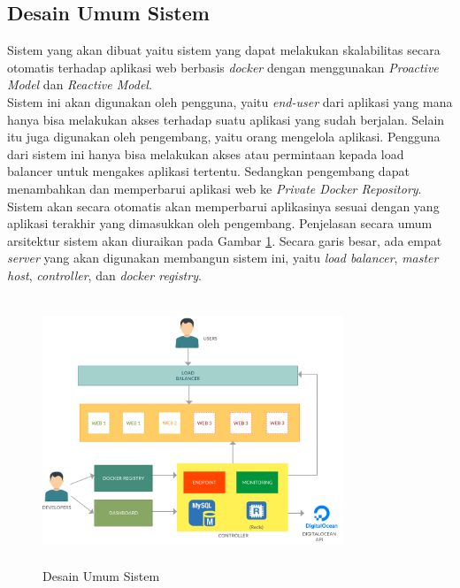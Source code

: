 		\subsection{Desain Umum Sistem}
			Sistem yang akan dibuat yaitu sistem yang dapat melakukan skalabilitas secara otomatis terhadap aplikasi web berbasis \textit{docker} dengan menggunakan \textit{Proactive Model} dan \textit{Reactive Model}.\\
			\indent Sistem ini akan digunakan oleh pengguna, yaitu \textit{end-user} dari aplikasi yang mana hanya bisa melakukan akses terhadap suatu aplikasi yang sudah berjalan. Selain itu juga digunakan oleh pengembang, yaitu orang mengelola aplikasi. Pengguna dari sistem ini hanya bisa melakukan akses atau permintaan kepada load balancer untuk mengakes aplikasi tertentu. Sedangkan pengembang dapat menambahkan dan memperbarui aplikasi web ke \textit{Private Docker Repository}. Sistem akan secara otomatis akan memperbarui aplikasinya sesuai dengan yang aplikasi terakhir yang dimasukkan oleh pengembang. Penjelasan secara umum arsitektur sistem akan diuraikan pada Gambar \ref{DesainUmumSistem}. Secara garis besar, ada empat \textit{server} yang akan digunakan membangun sistem ini, yaitu \textit{load balancer}, \textit{master host}, \textit{controller}, dan \textit{docker registry}.
            \begin{figure}[H]
				\centering
				\includegraphics[width=9cm,height=8cm]{Images/C-3/main.png}
				\caption{Desain Umum Sistem}
				\label{DesainUmumSistem}
			\end{figure}

